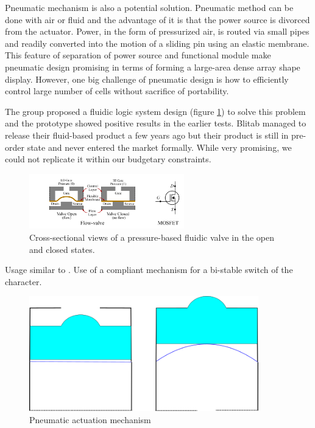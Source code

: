 Pneumatic mechanism is also a potential solution. Pneumatic method can be done with air or fluid and the advantage of it is that the power source is divorced from the actuator.
Power, in the form of pressurized air, is routed via small pipes and readily converted into the motion of a sliding pin using an elastic membrane.
This feature of separation of power source and functional module make pneumatic design promising in terms of forming a large-area dense array shape display.
However, one big challenge of pneumatic design is how to efficiently control large number of cells without sacrifice of portability.

The group proposed a fluidic logic system design (figure \ref{fig:pneumatic-schema}) to solve this problem and the prototype showed positive results in the earlier tests.
Blitab managed to release their fluid-based product a few years ago but their product is still in pre-order state and never entered the market formally.
While very promising, we could not replicate it within our budgetary constraints.
\begin{figure}\centering
    \includegraphics[width=0.6\textwidth]{figures/pneumatic-schema.png}
\caption{Cross-sectional views of a pressure-based fluidic valve in the open and closed states.}
\label{fig:pneumatic-schema}
\end{figure}

Usage similar to \cite{XieZhixin2021A2rB}. Use of a compliant mechanism for a bi-stable switch of the character.  
\begin{figure} \centering
    \includegraphics[height=5cm]{figures/pneumatic.png}
\caption{Pneumatic actuation mechanism}
\label{fig:pneumatic.png}
\end{figure}
